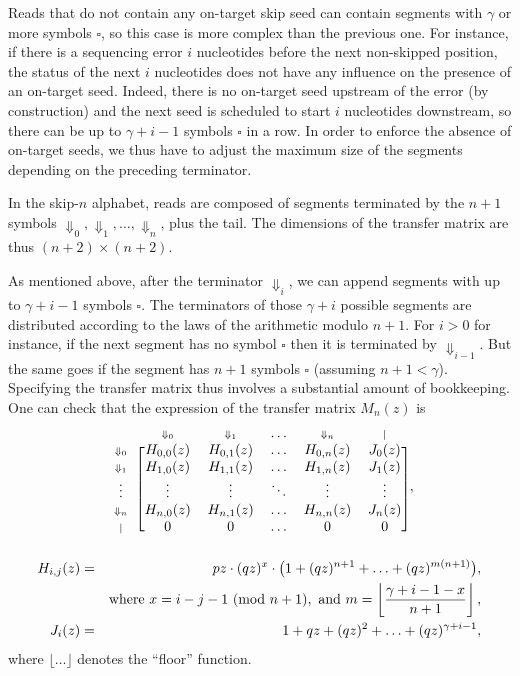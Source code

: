 \documentclass{article}
\newcommand{\Dn}[1]{\scriptstyle{\Downarrow_{#1}}}
\newcommand{\nd}{\scriptstyle{|}}
\newcommand{\modulo}[1]{\ (\mathrm{mod}\ #1)}
\begin{document}
Reads that do not contain any on-target skip seed can contain segments
with $\gamma$ or more symbols $\square$, so this case is more complex than
the previous one. For instance, if there is a sequencing error $i$
nucleotides before the next non-skipped position, the status of the next
$i$ nucleotides does not have any influence on the presence of an
on-target seed. Indeed, there is no on-target seed upstream of the error
(by construction) and the next seed is scheduled to start $i$ nucleotides
downstream, so there can be up to $\gamma+i-1$ symbols $\square$ in a row.
In order to enforce the absence of on-target seeds, we thus have to adjust
the maximum size of the segments depending on the preceding terminator.

In the skip-$n$ alphabet, reads are composed of segments terminated by the
$n+1$ symbols $\Downarrow_0, \Downarrow_1, \ldots, \Downarrow_n$, plus the
tail. The dimensions of the transfer matrix are thus $(n+2) \times (n+2)$.

As mentioned above, after the terminator $\Downarrow_i$, we can append
segments with up to $\gamma+i-1$ symbols $\square$. The terminators of
those $\gamma+i$ possible segments are distributed according to the laws
of the arithmetic modulo $n+1$. For $i > 0$ for instance, if the next
segment has no symbol $\square$ then it is terminated by
$\Downarrow_{i-1}$. But the same goes if the segment has $n+1$ symbols
$\square$ (assuming $n+1 < \gamma$). Specifying the transfer matrix thus
involves a substantial amount of bookkeeping. One can check that the
expression of the transfer matrix $M_n(z)$ is
\begin{equation*}
\begin{blockarray}{cccccc}
   & \Dn{0} & \Dn{1} & \ldots & \Dn{n} & \nd \\
\begin{block}{c[ccccc]}
\Dn{0} & H_{0,0}(z) & H_{0,1}(z) & \ldots & H_{0,n}(z) & J_0(z) \\
\Dn{1} & H_{1,0}(z) & H_{1,1}(z) & \ldots & H_{1,n}(z) & J_1(z) \\
\vdots & \vdots & \vdots & \ddots & \vdots & \vdots \\
\Dn{n} & H_{n,0}(z) & H_{n,1}(z) & \ldots & H_{n,n}(z) & J_n(z) \\
\nd & 0 & 0 & \ldots & 0 & 0 \\
\end{block}
\end{blockarray},
\end{equation*}
\begin{eqnarray}
H_{i,j}(z) &=& pz \cdot (qz)^x \cdot \big( 1 + (qz)^{n+1} +
  \ldots + (qz)^{m(n+1)} \big), \\
\notag
  &\;& \text{where } x = i-j-1 \modulo{n+1},
  \text{ and } m = \left\lfloor
  \frac{\gamma+i-1-x}{n+1} \right\rfloor, \\
J_i(z) &=& 1 + qz + (qz)^2 + \ldots + (qz)^{\gamma+i-1},
\end{eqnarray}
where $\lfloor \ldots \rfloor$ denotes the ``floor'' function.
\end{document}
